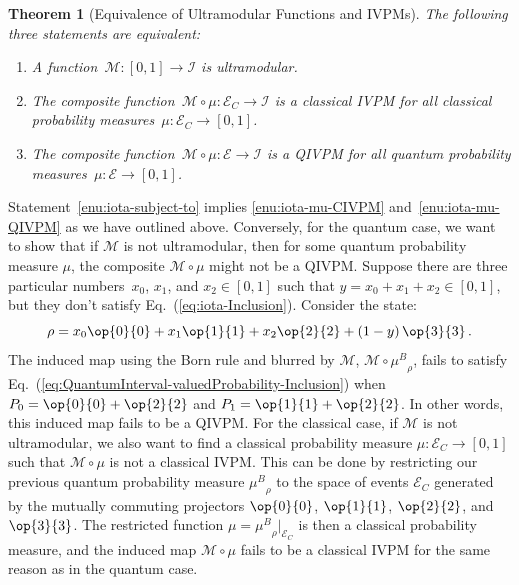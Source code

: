 \documentclass[english,reprint, aps, prl,superscriptaddress, showpacs,
showkeys, longbibliography, amsmath, amssymb, floatfix]{revtex4-1}
\theoremstyle{plain}
\newtheorem{thm}{Theorem}
\theoremstyle{definition}
\newcommand{\events}{\ensuremath{\mathcal{E}}}
\newcommand{\proj}[1]{\op{#1}{#1}}
\newcommand{\ultramodular}{\mathcal{M}}
\newcommand{\muB}{\ensuremath{\mu^{B}}}
\newcommand{\eventsC}{\ensuremath{\events_{C}}}
\begin{document}
\begin{thm}[Equivalence of Ultramodular Functions and IVPMs]\label{thm:iota-statements}The
following three statements are equivalent:
\begin{enumerate}
\item \label{enu:iota-subject-to}A function~$\ultramodular:\left[0,1\right]\rightarrow\mathscr{I}$
is ultramodular.
\item \label{enu:iota-mu-CIVPM}The composite
  function~$\ultramodular\circ\mu:\eventsC\rightarrow\mathscr{I}$
  is a classical IVPM for all classical probability
  measures~$\mu:\eventsC\rightarrow\left[0,1\right]$.
\item \label{enu:iota-mu-QIVPM}The composite
  function~$\ultramodular\circ\mu:\events\rightarrow\mathscr{I}$ is a
  QIVPM for all quantum probability
  measures~$\mu:\events\rightarrow\left[0,1\right]$.
\end{enumerate}
\end{thm}

Statement~\ref{enu:iota-subject-to} implies \ref{enu:iota-mu-CIVPM}
and~\ref{enu:iota-mu-QIVPM} as we have outlined above. Conversely, for the quantum case, we want
to show that if $\ultramodular$ is not ultramodular, then for
some quantum probability measure $\mu$, the composite
$\ultramodular\circ\mu$ might not be a QIVPM. Suppose there are three
particular numbers~$x_{0}$, $x_{1}$, and $x_{2}\in\left[0,1\right]$
such that $y=x_{0}+x_{1}+x_{2}\in\left[0,1\right]$, but they don't
satisfy Eq.~(\ref{eq:iota-Inclusion}). Consider the state:
\[
\rho=x_{0}\proj{0}+x_{1}\proj{1}+x_{2}\proj{2}+\left(1-y\right)\proj{3}\,.
\]
The induced map using the Born rule and blurred by $\ultramodular$,
$\ultramodular\circ\muB_{\rho}$, fails to satisfy
Eq.~(\ref{eq:QuantumInterval-valuedProbability-Inclusion}) when
$P_{0}=\proj{0}+\proj{2}$ and $P_{1}=\proj{1}+\proj{2}$. In other
words, this induced map fails to be a QIVPM. For the classical case, if
$\ultramodular$ is not ultramodular, we also want to find a classical
probability measure $\mu:\eventsC\rightarrow\left[0,1\right]$ such
that $\ultramodular\circ\mu$ is not a classical IVPM. This can be
done by restricting our previous quantum probability measure
$\muB_{\rho}$ to the space of events  $\eventsC$  generated by the
mutually commuting projectors $\proj{0}$, $\proj{1}$, $\proj{2}$, and
$\proj{3}$.  The restricted function
$\mu=\muB_{\rho}|_{\eventsC}$ is then a classical probability
measure, and the induced map $\ultramodular\circ\mu$ fails to be
a classical IVPM for the same reason as in the quantum case.
\end{document}
